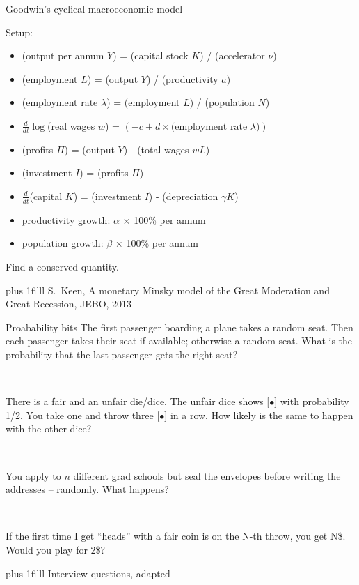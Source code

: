 \documentclass[onepage, 12pt]{beamer}
\def\Bottom#1{\vskip 0pt plus 1filll #1}
\begin{document}
%

\begin{frame}[t]{Goodwin's cyclical macroeconomic model}{}

    Setup:
    \begin{itemize}
    \item 
        (output per annum $Y$) = (capital stock $K$) / (accelerator $\nu$)
    \item
        (employment $L$) = (output $Y$) / (productivity $a$)
    \item
        (employment rate $\lambda$) = (employment $L$) / (population $N$)
    \item
        $\frac{d}{dt} \log$(real wages $w$)
        =
        $(-c + d \times \text{(employment rate $\lambda$)})$
    \item
        (profits $\Pi$) = (output $Y$) - (total wages $w L$)
    \item
        (investment $I$) = (profits $\Pi$)
    \item
        $\frac{d}{dt}$(capital $K$)
        =
        (investment $I$) - (depreciation $\gamma K$)
    \item
        productivity growth: $\alpha$ $\times$ 100\% per annum
    \item
        population growth: $\beta$ $\times$ 100\% per annum
    \end{itemize}
    
    Find a conserved quantity.
    
    \Bottom{%
        \footnotesize
        S.~Keen,
        A monetary Minsky model of the Great Moderation and Great Recession, 
        JEBO, 2013
    }
\end{frame}

%

\begin{frame}[t]{Proabability bits}{}
    The first passenger boarding a plane takes a random seat.
    Then each passenger takes their seat if available;
    otherwise a random seat.
    What is the probability that the last
    passenger gets the right seat?
    
    {\ }
    
    There is a fair and an unfair die/dice.
    The unfair dice shows [$\bullet$] with probability 1/2.
    You take one and throw three [$\bullet$] in a row.
    How likely
    is the same to happen with the other dice?
    
    {\ }
    
    You apply to $n$ different grad schools
    but seal the envelopes before 
    writing the addresses -- randomly. 
    What happens?
    
    {\ }
    
    If the first time I get ``heads'' with a fair coin is on the N-th throw,
    you get N\$.
    Would you play for 2\$?
    
    \Bottom{%
        \footnotesize
        Interview questions, adapted
    }
\end{frame}
\end{document}
